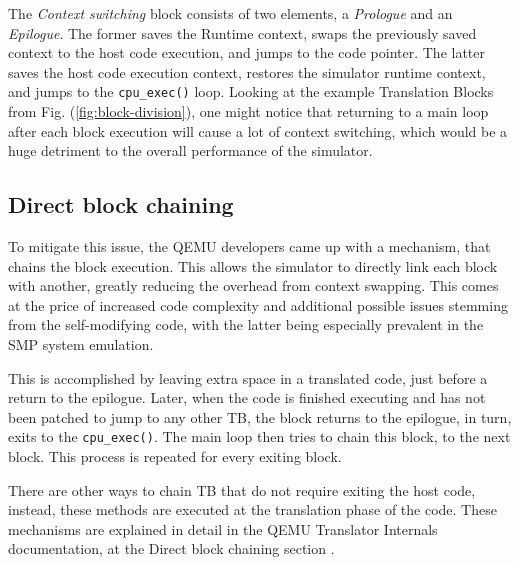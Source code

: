 \noindent
The \textit{Context switching} block consists of two elements, a \textit{Prologue} and an \textit{Epilogue}. The former
saves the Runtime context, swaps the previously saved context to the host code execution, and jumps to the code pointer.
The latter saves the host code execution context, restores the simulator runtime context, and jumps to the
\texttt{cpu\_exec()} loop.
Looking at the example Translation Blocks from Fig. (\ref{fig:block-division}), one might notice that returning to a
main loop after each block execution will cause a lot of context switching, which would be a huge detriment to the
overall performance of the simulator.

\subsection*{Direct block chaining}

To mitigate this issue, the QEMU developers came up with a mechanism, that chains the block execution. This allows the
simulator to directly link each block with another, greatly reducing the overhead from context swapping.
This comes at the price of increased code complexity and additional possible issues stemming from the
self-modifying code, with the latter being especially prevalent in the SMP system emulation.

This is accomplished by leaving extra space in a translated code, just before a return to the epilogue. Later, when
the code is finished executing and has not been patched to jump to any other TB, the block returns to the epilogue,
in turn, exits to the \texttt{cpu\_exec()}. The main loop then tries to chain this block, to the next block. This
process is repeated for every exiting block.

There are other ways to chain TB that do not require exiting the host code, instead, these methods are executed at the
translation phase of the code. These mechanisms are explained in detail in the QEMU Translator Internals documentation,
at the Direct block chaining section \cite{QemuDocsChaining}.

\pagebreak

